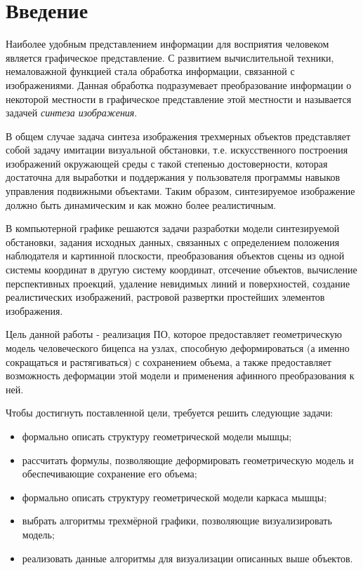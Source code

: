 \chapter*{Введение}

Наиболее удобным представлением информации для восприятия человеком является графическое представление. С развитием вычислительной техники, немаловажной функцией стала обработка информации, связанной с изображениями. Данная обработка подразумевает преобразование информации о некоторой местности в графическое представление этой местности и называется задачей \textit{синтеза изображения}.

В общем случае задача синтеза изображения трехмерных объектов представляет собой задачу имитации визуальной обстановки, т.е. искусственного построения изображений окружающей среды с такой степенью достоверности, которая достаточна для выработки и поддержания у пользователя программы навыков управления подвижными объектами. Таким образом, синтезируемое изображение должно быть динамическим и как можно более реалистичным.

В компьютерной графике решаются задачи разработки модели синтезируемой обстановки, задания исходных данных, связанных с определением положения наблюдателя и картинной плоскости, преобразования объектов сцены из одной системы координат в другую систему координат, отсечение объектов, вычисление перспективных проекций, удаление невидимых линий и поверхностей, создание реалистических изображений, растровой развертки простейших элементов изображения.

Цель данной работы - реализация ПО, которое предоставляет геометрическую модель человеческого бицепса на узлах, способную деформироваться (а именно сокращаться и растягиваться) с сохранением объема, а также предоставляет возможность деформации этой модели и применения афинного преобразования к ней.

Чтобы достигнуть поставленной цели, требуется решить следующие задачи:
\begin{itemize}
    \item формально описать структуру геометрической модели мышцы;
    \item рассчитать формулы, позволяющие деформировать геометрическую модель и обеспечивающие сохранение его объема;
    \item формально описать структуру геометрической модели каркаса мышцы;
    \item выбрать алгоритмы трехмёрной графики, позволяющие визуализировать модель;
    \item реализовать данные алгоритмы для визуализации описанных выше объектов.
\end{itemize}
